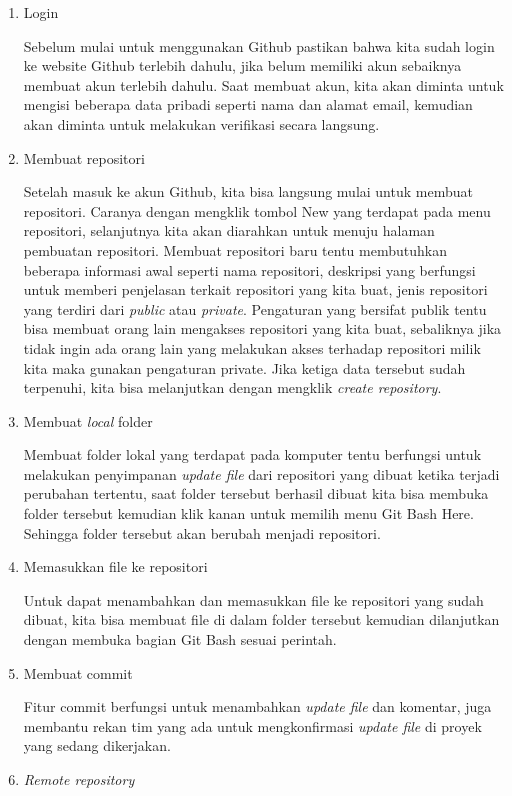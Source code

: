 \begin{enumerate}
    \item Login
    
    Sebelum mulai untuk menggunakan Github pastikan bahwa kita sudah login ke website Github terlebih dahulu, jika belum memiliki akun sebaiknya membuat akun terlebih dahulu. Saat membuat akun, kita akan diminta untuk mengisi beberapa data pribadi seperti nama dan alamat email, kemudian akan diminta untuk melakukan verifikasi secara langsung.
    \item Membuat repositori
    
    Setelah masuk ke akun Github, kita bisa langsung mulai untuk membuat repositori. Caranya dengan mengklik tombol New yang terdapat pada menu repositori, selanjutnya kita akan diarahkan untuk menuju halaman pembuatan repositori. Membuat repositori baru tentu membutuhkan beberapa informasi awal seperti nama repositori, deskripsi yang berfungsi untuk memberi penjelasan terkait repositori yang kita buat, jenis repositori yang terdiri dari \textit{public} atau \textit{private}. Pengaturan yang bersifat publik tentu bisa membuat orang lain mengakses repositori yang kita buat, sebaliknya jika tidak ingin ada orang lain yang melakukan akses terhadap repositori milik kita maka gunakan pengaturan private. Jika ketiga data tersebut sudah terpenuhi, kita bisa melanjutkan dengan mengklik \textit{create repository}.
    \item Membuat \textit{local} folder
    
    Membuat folder lokal yang terdapat pada komputer tentu berfungsi untuk melakukan penyimpanan \textit{update file} dari repositori yang dibuat ketika terjadi perubahan tertentu, saat folder tersebut berhasil dibuat kita bisa membuka folder tersebut kemudian klik kanan untuk memilih menu Git Bash Here. Sehingga folder tersebut akan berubah menjadi repositori.
    \item Memasukkan file ke repositori
    
    Untuk dapat menambahkan dan memasukkan file ke repositori yang sudah dibuat, kita bisa membuat file di dalam folder tersebut kemudian dilanjutkan dengan membuka bagian Git Bash sesuai perintah.
    \item Membuat commit
    
    Fitur commit berfungsi untuk menambahkan \textit{update file} dan komentar, juga membantu rekan tim yang ada untuk mengkonfirmasi \textit{update file} di proyek yang sedang dikerjakan.
    \item \textit{Remote repository}
    

\end{enumerate}
